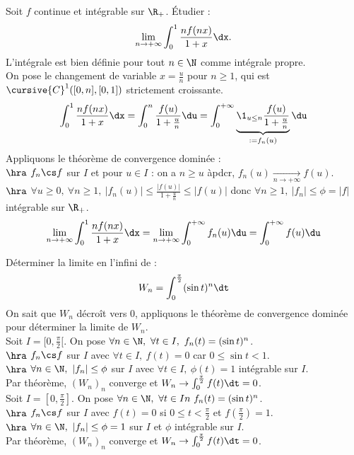 \documentclass[11pt]{article}
\begin{document}
\begin{ex}{}{}
    Soit $f$ continue et intégrable sur $\R_+$. Étudier :
    \begin{equation*}
        \lim_{n\to+\infty} \int_0^1\frac{nf(nx)}{1+x}\dx.
    \end{equation*}
    \tcblower
    L'intégrale est bien définie pour tout $n\in\N$ comme intégrale propre.\\
    On pose le changement de variable $x=\frac{u}{n}$ pour $n\geq1$, qui est $\cursive{C}^1([0,n],[0,1])$ strictement croissante.
    \begin{equation*}
        \int_0^1\frac{nf(nx)}{1+x}\dx = \int_0^n\frac{f(u)}{1+\frac{u}{n}}\du = \int_0^{+\infty}\underbrace{\1_{u\leq n}\frac{f(u)}{1+\frac{u}{n}}}_{:=f_n(u)}\du
    \end{equation*}
    Appliquons le théorème de convergence dominée :\\
    $\hra$ $f_n\cs f$ sur $I$ et pour $u\in I$ : on a $n\geq u$ àpdcr, $f_n(u)\xrightarrow[n\to+\infty]{}f(u)$.\\
    $\hra$ $\forall u \geq 0, ~ \forall n \geq 1, ~ |f_n(u)|\leq\frac{|f(u)|}{1+\frac{u}{n}}\leq|f(u)|$ donc $\forall n \geq 1, ~ |f_n|\leq \phi=|f|$ intégrable sur $\R_+$.
    \begin{equation*}
        \lim_{n\to+\infty}\int_0^1\frac{nf(nx)}{1+x}\dx=\lim_{n\to+\infty}\int_0^{+\infty}f_n(u)\du=\int_0^{+\infty}f(u)\du
    \end{equation*}
\end{ex}

\begin{ex}{}{}
    Déterminer la limite en l'infini de :
    \begin{equation*}
        W_n = \int_0^{\frac{\pi}{2}}(\sin t)^n\dt
    \end{equation*}
    \tcblower
    On sait que $W_n$ décroît vers 0, appliquons le théorème de convergence dominée pour déterminer la limite de $W_n$.\\
     Soit $I=[0,\frac{\pi}{2}[$. On pose $\forall n \in \N, ~ \forall t \in I, ~ f_n(t)=(\sin t)^n$.\\
    $\hra$ $f_n\cs f$ sur $I$ avec $\forall t \in I, ~ f(t)=0$ car $0\leq \sin t < 1$.\\
    $\hra$ $\forall n \in \N, ~ |f_n|\leq \phi$ sur $I$ avec $\forall t \in I, ~ \phi(t)=1$ intégrable sur $I$.\\
    Par théorème, $(W_n)_n$ converge et $W_n\to\int_0^{\frac{\pi}{2}}f(t)\dt=0$.\\
     Soit $I=[0,\frac{\pi}{2}]$. On pose $\forall n \in \N, ~ \forall t \in In ~ f_n(t)=(\sin t)^n$.\\
    $\hra$ $f_n\cs f$ sur $I$ avec $f(t)=0$ si $0\leq t < \frac{\pi}{2}$ et $f(\frac{\pi}{2})=1$.\\
    $\hra$ $\forall n \in \N, ~ |f_n|\leq\phi=1$ sur $I$ et $\phi$ intégrable sur $I$.\\
    Par théorème, $(W_n)_n$ converge et $W_n\to\int_0^{\frac{\pi}{2}}f(t)\dt=0$.
\end{ex}
\end{document}
